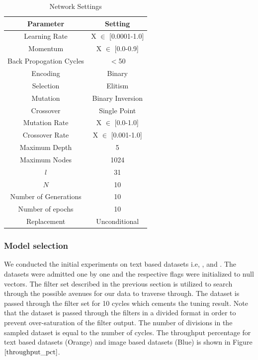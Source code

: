 \documentclass[conference]{IEEEtran}
\begin{document}
\begin{table}[htbp]
\caption{Network Settings}
\begin{center}
\begin{tabular}{ c  c }
\hline
\textbf{Parameter}&\textbf{Setting}\\
\hline
\hline
{Learning Rate}&{X $\in$ [0.0001-1.0]}\\
\hline
{Momentum}&{X $\in$ [0.0-0.9]}\\
\hline
{Back Propogation Cycles}&{$<$50}\\
\hline
{Encoding}&{Binary}\\
\hline
{Selection}&{Elitism}\\
\hline
{Mutation}&{Binary Inversion}\\
\hline
{Crossover}&{Single Point}\\
\hline
{Mutation Rate}&{X $\in$ [0.0-1.0]}\\
\hline
{Crossover Rate}&{X $\in$ [0.001-1.0]}\\
\hline
{Maximum Depth}&{5}\\
\hline
{Maximum Nodes}&{1024}\\
\hline
{$l$}&{31}\\
\hline
{$N$}&{10}\\
\hline
{Number of Generations}&{10}\\
\hline
{Number of epochs}&{10}\\
\hline
{Replacement}&{Unconditional}\\
\hline
\end{tabular}
\label{tab1}
\end{center}
\end{table}


\subsubsection{Model selection}

We conducted the initial experiments on text based datasets i.e, \cite{IMDB}, \cite{reuters} and \cite{boston}. The datasets were admitted one by one and the respective flags were initialized to null vectors. The filter set described in the previous section is utilized to search through the possible avenues for our data to traverse through. The dataset is passed through the filter set for 10 cycles which cements the tuning result. Note that the dataset is passed through the filters in a divided format in order to prevent over-saturation of the filter output. The number of divisions in the sampled dataset is equal to the number of cycles. The throughput percentage for text based datasets (Orange) and image based datasets (Blue) is shown in Figure $\ref{throughput_pct}$. 
\end{document}
